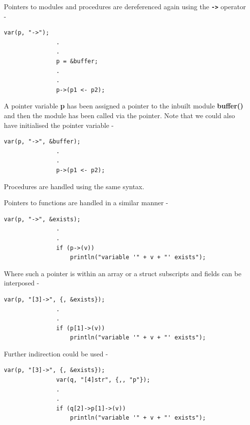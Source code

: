             Pointers to modules and procedures are dereferenced again using
            the {\bf \verb'->'} operator -
            \begin{lstlisting}[gobble=12, language=threepl]
               var(p, "->");
               .
               .
               p = &buffer;
               .
               .
               p->(p1 <- p2);
            \end{lstlisting}
            A pointer variable {\bf p} has been assigned a pointer to the
            inbuilt module {\bf buffer()} and then the module has been
            called via the pointer. Note that we could also have initialised
            the pointer variable -
            \begin{lstlisting}[gobble=12, language=threepl]
               var(p, "->", &buffer);
               .
               .
               p->(p1 <- p2);
            \end{lstlisting}
            Procedures are handled using the same syntax.
            
            Pointers to functions are handled in a similar manner -
            \begin{lstlisting}[gobble=12, language=threepl]
               var(p, "->", &exists);
               .
               .
               if (p->(v))
                   println("variable '" + v + "' exists");
            \end{lstlisting}
            
            Where such a pointer is within an array or a struct subscripts
            and fields can be interposed -
            \begin{lstlisting}[gobble=12, language=threepl]
               var(p, "[3]->", {, &exists});
               .
               .
               if (p[1]->(v))
                   println("variable '" + v + "' exists");
            \end{lstlisting}
            
            Further indirection could be used -
            \begin{lstlisting}[gobble=12, language=threepl]
               var(p, "[3]->", {, &exists});
               var(q, "[4]str", {,, "p"});
               .
               .
               if (q[2]->p[1]->(v))
                   println("variable '" + v + "' exists");
            \end{lstlisting}
            
